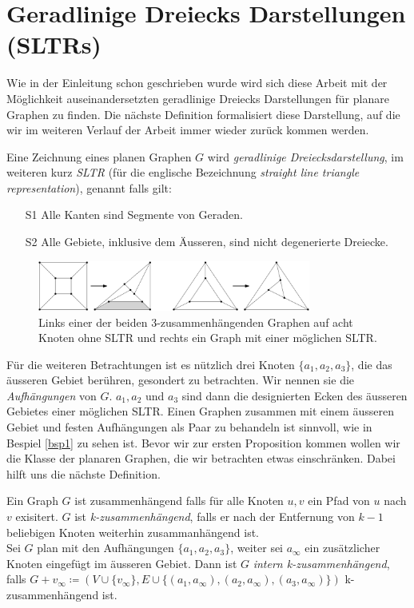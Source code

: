 \section{Geradlinige Dreiecks Darstellungen (SLTRs)}

Wie in der Einleitung schon geschrieben wurde wird sich diese Arbeit mit der Möglichkeit auseinandersetzten geradlinige Dreiecks Darstellungen für planare Graphen zu finden. Die nächste Definition formalisiert diese Darstellung, auf die wir im weiteren Verlauf der Arbeit immer wieder zurück kommen werden.

\begin{definition}[SLTR]\label{defsltr}
Eine Zeichnung eines planen Graphen $G$ wird \textit{geradlinige Dreiecksdarstellung}, im weiteren kurz \textit{SLTR} (für die englische Bezeichnung \textit{straight line triangle representation}), genannt falls gilt:
\begin{itemize}
\item[S1] Alle Kanten sind Segmente von Geraden.
\item[S2] Alle Gebiete, inklusive dem Äusseren, sind nicht degenerierte Dreiecke.
\end{itemize}
\end{definition}

\begin{figure}[h]
	\centering
  \includegraphics[width=0.8\textwidth]{sltr-example.png}
	\caption{Links einer der beiden 3-zusammenhängenden Graphen auf acht Knoten ohne SLTR und rechts ein Graph mit einer möglichen SLTR.}
\end{figure}

Für die weiteren Betrachtungen ist es nützlich drei Knoten $\{a_1,a_2,a_3\}$, die das äusseren Gebiet berühren, gesondert zu betrachten. Wir nennen sie die \textit{Aufhängungen} von $G$. $a_1,a_2$ und $a_3$ sind dann die designierten Ecken des äusseren Gebietes einer möglichen SLTR. Einen Graphen zusammen mit einem äusseren Gebiet und festen Aufhängungen als Paar zu behandeln ist sinnvoll, wie in Bespiel \ref{bsp1} zu sehen ist. Bevor wir zur ersten Proposition kommen wollen wir die Klasse der planaren Graphen, die wir betrachten etwas einschränken. Dabei hilft uns die nächste Definition.

\begin{definition}\label{int_3_con}
Ein Graph $G$ ist zusammenhängend falls für alle Knoten $u,v$ ein Pfad von $u$ nach $v$ exisitert. $G$ ist \textit{k-zusammenhängend}, falls er nach der Entfernung von $k-1$ beliebigen Knoten weiterhin zusammanhängend ist.\\
Sei $G$ plan mit den Aufhängungen $\{a_1,a_2,a_3\}$, weiter sei $a_\infty$ ein zusätzlicher Knoten eingefügt im äusseren Gebiet. Dann ist $G$ \textit{intern k-zusammenhängend}, falls $G+v_\infty\coloneqq(V\cup\{v_\infty \},E\cup \{(a_1,a_\infty),(a_2,a_\infty),(a_3,a_\infty)\})$ k-zusammenhängend ist. 
\end{definition}

